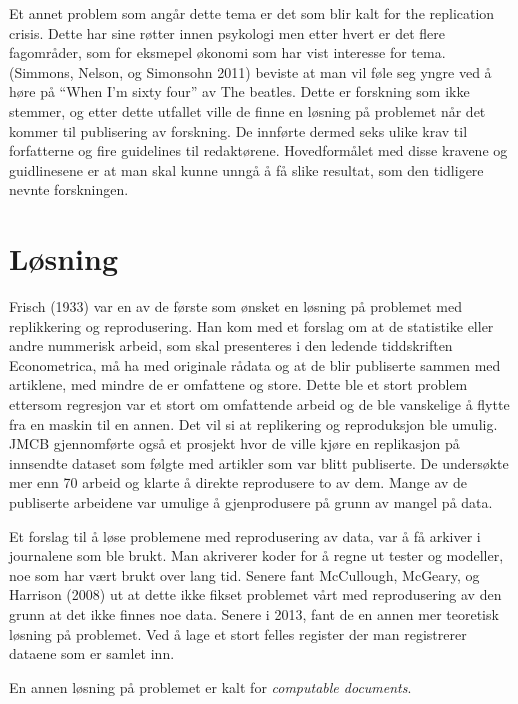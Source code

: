 \documentclass[
  12pt,
  norsk,
]{article}
\begin{document}
Et annet problem som angår dette tema er det som blir kalt for the
replication crisis. Dette har sine røtter innen psykologi men etter
hvert er det flere fagområder, som for eksmepel økonomi som har vist
interesse for tema. (Simmons, Nelson, og Simonsohn 2011) beviste at man
vil føle seg yngre ved å høre på ``When I'm sixty four'' av The beatles.
Dette er forskning som ikke stemmer, og etter dette utfallet ville de
finne en løsning på problemet når det kommer til publisering av
forskning. De innførte dermed seks ulike krav til forfatterne og fire
guidelines til redaktørene. Hovedformålet med disse kravene og
guidlinesene er at man skal kunne unngå å få slike resultat, som den
tidligere nevnte forskningen.

\newpage

\hypertarget{luxf8sning}{%
\section{Løsning}\label{luxf8sning}}

Frisch (1933) var en av de første som ønsket en løsning på problemet med
replikkering og reprodusering. Han kom med et forslag om at de
statistike eller andre nummerisk arbeid, som skal presenteres i den
ledende tiddskriften Econometrica, må ha med originale rådata og at de
blir publiserte sammen med artiklene, med mindre de er omfattene og
store. Dette ble et stort problem ettersom regresjon var et stort om
omfattende arbeid og de ble vanskelige å flytte fra en maskin til en
annen. Det vil si at replikering og reproduksjon ble umulig. JMCB
gjennomførte også et prosjekt hvor de ville kjøre en replikasjon på
innsendte dataset som følgte med artikler som var blitt publiserte. De
undersøkte mer enn 70 arbeid og klarte å direkte reprodusere to av dem.
Mange av de publiserte arbeidene var umulige å gjenprodusere på grunn av
mangel på data.

Et forslag til å løse problemene med reprodusering av data, var å få
arkiver i journalene som ble brukt. Man akriverer koder for å regne ut
tester og modeller, noe som har vært brukt over lang tid. Senere fant
McCullough, McGeary, og Harrison (2008) ut at dette ikke fikset
problemet vårt med reprodusering av den grunn at det ikke finnes noe
data. Senere i 2013, fant de en annen mer teoretisk løsning på
problemet. Ved å lage et stort felles register der man registrerer
dataene som er samlet inn.

En annen løsning på problemet er kalt for \emph{computable documents}.
\end{document}
